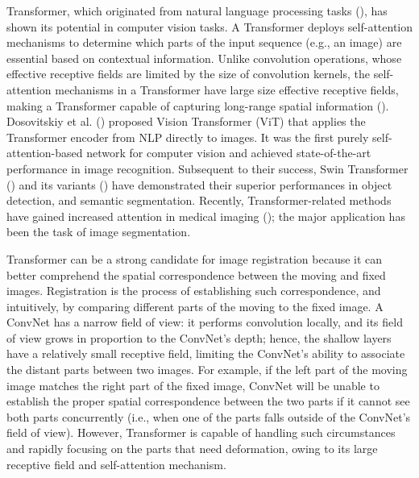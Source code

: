 \documentclass[times,twocolumn,final]{elsarticle}
\begin{document}
Transformer, which originated from natural language processing tasks (\cite{vaswani2017attention}), has shown its potential in computer vision tasks. A Transformer deploys self-attention mechanisms to determine which parts of the input sequence (e.g., an image) are essential based on contextual information. Unlike convolution operations, whose effective receptive fields are limited by the size of convolution kernels, the self-attention mechanisms in a Transformer have large size effective receptive fields, making a Transformer capable of capturing long-range spatial information (\cite{li2021medical}). Dosovitskiy et al. (\cite{dosovitskiy2020image}) proposed Vision Transformer (ViT) that applies the Transformer encoder from NLP directly to images. It was the first purely self-attention-based network for computer vision and achieved state-of-the-art performance in image recognition. Subsequent to their success, Swin Transformer (\cite{liu2021swin}) and its variants (\cite{dai2021dynamic, dong2021cswin}) have demonstrated their superior performances in object detection, and semantic segmentation. Recently, Transformer-related methods have gained increased attention in medical imaging (\cite{chen2021transunet, xie2021cotr, wang2021transbts, li2021medical, wang2021ted, zhang2021transct}); the major application has been the task of image segmentation. 

Transformer can be a strong candidate for image registration because it can better comprehend the spatial correspondence between the moving and fixed images. Registration is the process of establishing such correspondence, and intuitively, by comparing different parts of the moving to the fixed image. A ConvNet has a narrow field of view: it performs convolution locally, and its field of view grows in proportion to the ConvNet's depth; hence, the shallow layers have a relatively small receptive field, limiting the ConvNet's ability to associate the distant parts between two images. For example, if the left part of the moving image matches the right part of the fixed image, ConvNet will be unable to establish the proper spatial correspondence between the two parts if it cannot see both parts concurrently (i.e., when one of the parts falls outside of the ConvNet's field of view). However, Transformer is capable of handling such circumstances and rapidly focusing on the parts that need deformation, owing to its large receptive field and self-attention mechanism.
\end{document}
